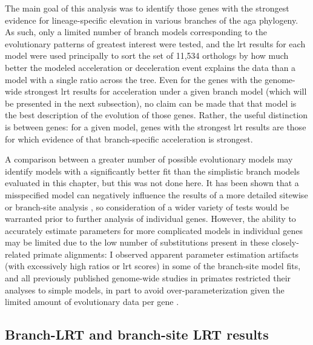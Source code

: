 The main goal of this analysis was to identify those genes with the
strongest evidence for lineage-specific elevation in various branches
of the \ac{aga} phylogeny. As such, only a limited number of branch
models corresponding to the evolutionary patterns of greatest interest
were tested, and the \ac{lrt} results for each model were used
principally to sort the set of 11,534 orthologs by how much better the
modeled \dnds acceleration or deceleration event explains the data
than a model with a single \dnds ratio across the tree. Even for the
genes with the genome-wide strongest \ac{lrt} results for \dnds
acceleration under a given branch model (which will be presented in
the next subsection), no claim can be made that that model is the best
description of the evolution of those genes. Rather, the useful
distinction is between genes: for a given model, genes with the
strongest \ac{lrt} results are those for which evidence of that
branch-specific \dnds acceleration is strongest.

A comparison between a greater number of possible evolutionary models
may identify models with a significantly better fit than the
simplistic branch models evaluated in this chapter, but this was not
done here. It has been shown that a misspecified model can negatively
influence the results of a more detailed sitewise or branch-site
analysis \citep{Pond2011}, so consideration of a wider variety of
tests would be warranted prior to further analysis of individual
genes. However, the ability to accurately estimate parameters for more
complicated models in individual genes may be limited due to the low
number of substitutions present in these closely-related primate
alignments: I observed apparent parameter estimation artifacts (with
excessively high \dnds ratios or \ac{lrt} scores) in some of the
branch-site model fits, and all previously published genome-wide
studies in primates restricted their analyses to simple models, in
part to avoid over-parameterization given the limited amount of
evolutionary data per gene \citep{Clark2003,Nielsen2005}.


\subsection{Branch-LRT and branch-site LRT results}

